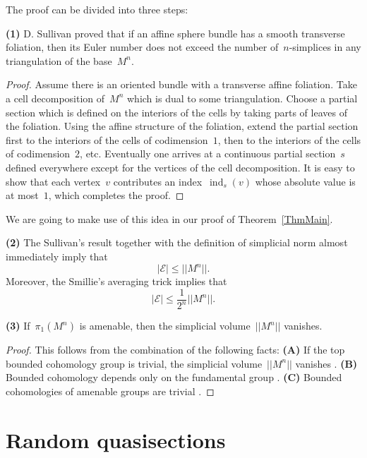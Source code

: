 \documentclass[12pt]{amsart}
\theoremstyle{plain}
\theoremstyle{definition}
\theoremstyle{plain}
\theoremstyle{definition}
\renewcommand{\leq}{\leqslant}
\DeclareMathOperator{\ind}{ind}
\begin{document}


The proof can be divided into three steps:
\medskip

	\textbf{(1)}	
 D. Sullivan \cite{Sullivan} proved that if an affine sphere bundle has a smooth transverse foliation, then its Euler number does not exceed the number of~$n$-simplices in any triangulation of  the base~$M^n$.


\begin{proof}
  Assume there is an { oriented  bundle  with a transverse affine foliation.}  Take a cell decomposition of~$M^n$ which is dual to some triangulation.
Choose a partial section which is defined on the interiors of the cells by taking parts of leaves of the foliation.  Using the affine structure of the foliation, extend the partial section first to the interiors of the cells of codimension~$1$, then  to the interiors of the cells of codimension~$2$, etc. Eventually one arrives at a continuous partial section~$s$ defined everywhere except for the vertices of the cell decomposition.  It is easy to show that each vertex~$v$
contributes an index~$\ind_s(v)$  whose absolute value is at most~$1$, which completes the proof.
\end{proof}

We are going to make use of this idea in our proof of Theorem~\ref{ThmMain}.
\medskip


\textbf{(2)} The Sullivan's result together with the definition of simplicial norm almost immediately imply that
$$|\mathcal{E}|\leq ||M^n||.$$   Moreover, the Smillie's averaging trick implies that
 $$|\mathcal{E}|\leq {\frac{1}{2^n}||M^n||}.$$



\textbf{(3)}   If~$\pi_1(M^n)$  is amenable, then  the simplicial volume~$||M^n||$  vanishes.
\begin{proof} This follows from the combination of the following facts:
    \textbf{ (A) } If the top  bounded cohomology group is trivial, the simplicial volume~$||M^n||$  vanishes .   \textbf{(B)} Bounded cohomology depends only on the fundamental group \cite{Gromov, Ivanov}.  \textbf{ (C)}  Bounded cohomologies of amenable groups are trivial \cite{HirshThurst}. 
\end{proof}



\section{Random quasisections}
\end{document}
